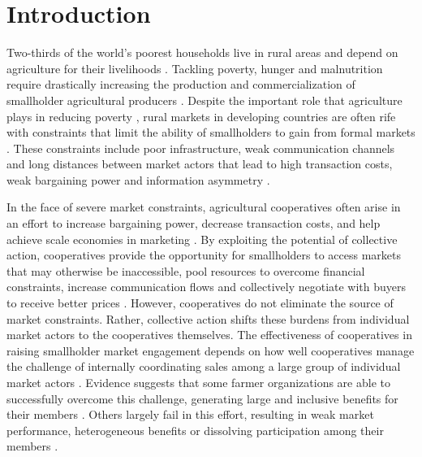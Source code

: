 \documentclass[11pt]{article}
\begin{document}
\clearpage
\renewcommand{\cftsecleader}{\cftdotfill{\cftdotsep}}


\doublespacing
\thispagestyle{plain}
\setcounter{page}{1}

\section{Introduction} \label{sec:intro}
Two-thirds of the world's poorest households live in rural areas and depend on agriculture for their livelihoods \citep{k_fuglie_harvesting_2019}. Tackling poverty, hunger and malnutrition require drastically increasing the production and commercialization of smallholder agricultural producers \citep{fischer_smallholder_2014,world_bank_world_2008}. Despite the important role that agriculture plays in reducing poverty \citep{k_fuglie_harvesting_2019}, rural markets in developing countries are often rife with constraints that limit the ability of smallholders to gain from formal markets \citep{ashby_investing_nodate,p_kristjanson_notitle_2014}. These constraints include poor infrastructure, weak communication channels and long distances between market actors that lead to high transaction costs, weak bargaining power and information asymmetry \citep{aker_information_2010,barrett_smallholder_2008,key_transactions_2000,staal_smallholder_1997}. 

In the face of severe market constraints, %
agricultural cooperatives often arise in an effort to increase bargaining power, decrease transaction costs, and help achieve scale economies in marketing %
\citep{markelova_collective_2010,rondot_agricultural_2001,staal_smallholder_1997,csaki_reaching_2003}. By exploiting the potential of collective action, cooperatives provide the opportunity for smallholders to access markets that may otherwise be inaccessible, pool resources to overcome financial constraints, increase communication flows and collectively negotiate with buyers to receive better prices \citep{poole_review_2010}. However, cooperatives do not eliminate the source of market constraints. Rather, collective action shifts these burdens from individual market actors to the cooperatives themselves. The effectiveness of cooperatives in raising smallholder market engagement depends on how well cooperatives manage the challenge of internally coordinating sales among a large group of individual market actors \citep{mullally_impact_2020}. Evidence suggests that some farmer organizations are able to successfully overcome this challenge, generating large and inclusive benefits for their members \citep{narrod_publicprivate_2009,tadesse_mobile_2015,wollni_farmers_2007}. Others largely fail in this effort, resulting in weak market performance, heterogeneous benefits or dissolving participation among their members \citep{aflagah_cheap_2019,bernard_reaching_2009, casaburi_loyalty_2015}. 
\end{document}
